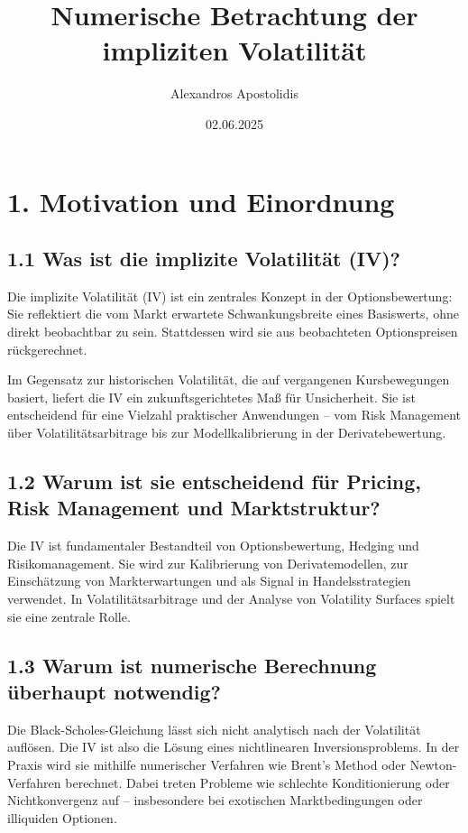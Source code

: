 \documentclass[a4paper,12pt]{article}
\title{Numerische Betrachtung der impliziten Volatilität}
\author{Alexandros Apostolidis}
\date{02.06.2025}
\begin{document}
\maketitle


\section*{1. Motivation und Einordnung}

\subsection*{1.1 Was ist die implizite Volatilität (IV)?}
Die implizite Volatilität (IV) ist ein zentrales Konzept in der Optionsbewertung: Sie reflektiert die vom Markt erwartete Schwankungsbreite eines Basiswerts, ohne direkt beobachtbar zu sein. Stattdessen wird sie aus beobachteten Optionspreisen rückgerechnet.

Im Gegensatz zur historischen Volatilität, die auf vergangenen Kursbewegungen basiert, liefert die IV ein zukunftsgerichtetes Maß für Unsicherheit. Sie ist entscheidend für eine Vielzahl praktischer Anwendungen – vom Risk Management über Volatilitätsarbitrage bis zur Modellkalibrierung in der Derivatebewertung.

\subsection*{1.2 Warum ist sie entscheidend für Pricing, Risk Management und Marktstruktur?}
Die IV ist fundamentaler Bestandteil von Optionsbewertung, Hedging und Risikomanagement. Sie wird zur Kalibrierung von Derivatemodellen, zur Einschätzung von Markterwartungen und als Signal in Handelsstrategien verwendet. In Volatilitätsarbitrage und der Analyse von Volatility Surfaces spielt sie eine zentrale Rolle.

\subsection*{1.3 Warum ist numerische Berechnung überhaupt notwendig?}
Die Black-Scholes-Gleichung lässt sich nicht analytisch nach der Volatilität auflösen. Die IV ist also die Lösung eines nichtlinearen Inversionsproblems. In der Praxis wird sie mithilfe numerischer Verfahren wie Brent’s Method oder Newton-Verfahren berechnet. Dabei treten Probleme wie schlechte Konditionierung oder Nichtkonvergenz auf – insbesondere bei exotischen Marktbedingungen oder illiquiden Optionen.
\end{document}
